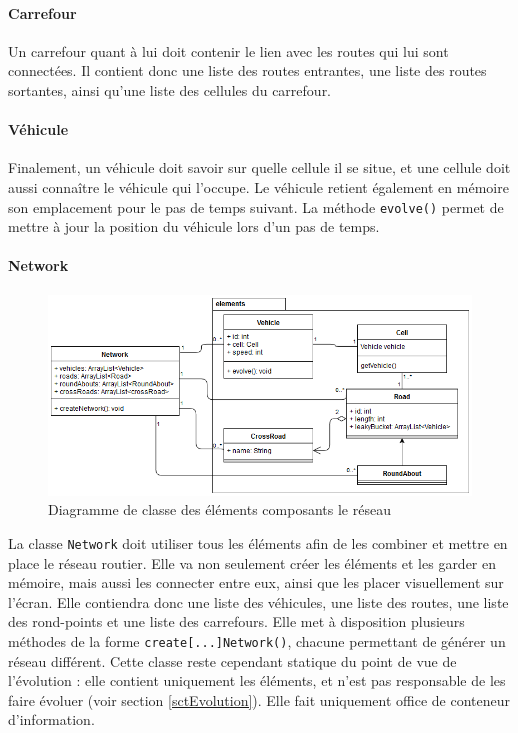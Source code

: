 \documentclass[a4paper,11pt, titlepage]{extarticle}
\begin{document}
\paragraph{Carrefour}

Un carrefour quant à lui doit contenir le lien avec les routes qui lui sont connectées. Il contient donc une liste des routes entrantes, une liste des routes sortantes, ainsi qu'une liste des cellules du carrefour.

\paragraph{Véhicule}

Finalement, un véhicule doit savoir sur quelle cellule il se situe, et une cellule doit aussi connaître le véhicule qui l'occupe. Le véhicule retient également en mémoire son emplacement pour le pas de temps suivant. La méthode \texttt{evolve()} permet de mettre à jour la position du véhicule lors d'un pas de temps.

\paragraph{Network}

\begin{figure}[!h]
\begin{center}
\includegraphics[width=13cm]{elements_diagram.png}
\caption{Diagramme de classe des éléments composants le réseau}
\label{imgElements}
\end{center}
\end{figure}

La classe \texttt{Network} doit utiliser tous les éléments afin de les combiner et mettre en place le réseau routier. Elle va non seulement créer les éléments et les garder en mémoire, mais aussi les connecter entre eux, ainsi que les placer visuellement sur l'écran. Elle contiendra donc une liste des véhicules, une liste des routes, une liste des rond-points et une liste des carrefours. Elle met à disposition plusieurs méthodes de la forme \texttt{create[...]Network()}, chacune permettant de générer un réseau différent. Cette classe reste cependant statique du point de vue de l'évolution : elle contient uniquement les éléments, et n'est pas responsable de les faire évoluer (voir section \ref{sctEvolution}). Elle fait uniquement office de conteneur d'information.
\end{document}
